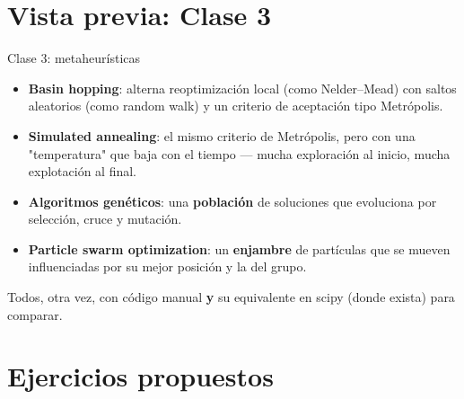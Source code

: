 \documentclass[aspectratio=169,10pt]{beamer}
\begin{document}
\section{Vista previa: Clase 3}

\begin{frame}{Clase 3: metaheurísticas}
  \begin{itemize}
    \item \textbf{Basin hopping}: alterna reoptimización local (como
      Nelder--Mead) con saltos aleatorios (como random walk) y un
      criterio de aceptación tipo Metrópolis.
    \item \textbf{Simulated annealing}: el mismo criterio de Metrópolis,
      pero con una "temperatura" que baja con el tiempo — mucha
      exploración al inicio, mucha explotación al final.
    \item \textbf{Algoritmos genéticos}: una \textbf{población} de
      soluciones que evoluciona por selección, cruce y mutación.
    \item \textbf{Particle swarm optimization}: un \textbf{enjambre} de
      partículas que se mueven influenciadas por su mejor posición y la
      del grupo.
  \end{itemize}
  \vspace{0.3cm}
  \begin{alertblock}{}
    Todos, otra vez, con código manual \textbf{y} su equivalente en
    scipy (donde exista) para comparar.
  \end{alertblock}
\end{frame}

\section{Ejercicios propuestos}
\end{document}
